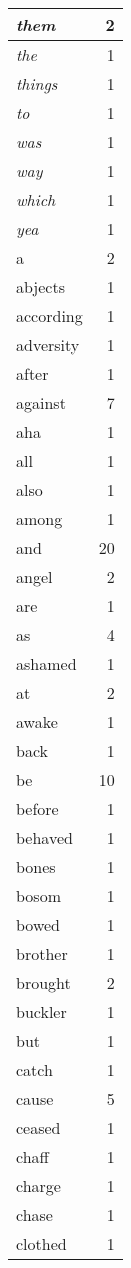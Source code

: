 \begin{center}
\begin{longtable}{l|r}
\emph{them} & 2 \\ \hline
\emph{the} & 1 \\ \hline
\emph{things} & 1 \\ \hline
\emph{to} & 1 \\ \hline
\emph{was} & 1 \\ \hline
\emph{way} & 1 \\ \hline
\emph{which} & 1 \\ \hline
\emph{yea} & 1 \\ \hline
a & 2 \\ \hline
abjects & 1 \\ \hline
according & 1 \\ \hline
adversity & 1 \\ \hline
after & 1 \\ \hline
against & 7 \\ \hline
aha & 1 \\ \hline
all & 1 \\ \hline
also & 1 \\ \hline
among & 1 \\ \hline
and & 20 \\ \hline
angel & 2 \\ \hline
are & 1 \\ \hline
as & 4 \\ \hline
ashamed & 1 \\ \hline
at & 2 \\ \hline
awake & 1 \\ \hline
back & 1 \\ \hline
be & 10 \\ \hline
before & 1 \\ \hline
behaved & 1 \\ \hline
bones & 1 \\ \hline
bosom & 1 \\ \hline
bowed & 1 \\ \hline
brother & 1 \\ \hline
brought & 2 \\ \hline
buckler & 1 \\ \hline
but & 1 \\ \hline
catch & 1 \\ \hline
cause & 5 \\ \hline
ceased & 1 \\ \hline
chaff & 1 \\ \hline
charge & 1 \\ \hline
chase & 1 \\ \hline
clothed & 1 \\ \hline

\end{longtable}
\end{center}
